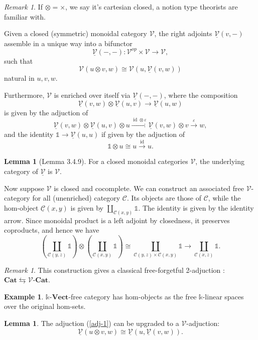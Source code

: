 \documentclass[11pt]{article}
\theoremstyle{definition}
\newtheorem{lemma}[theorem]{Lemma}
\newtheorem{example}[theorem]{Example}
\theoremstyle{remark}
\newtheorem{remark}[theorem]{Remark}
\newcommand{\id}{\operatorname{id}}
\newcommand{\calC}{\mathcal{C}}
\newcommand{\ucalC}{\underline{\mathcal{C}}}
\newcommand{\calV}{\mathcal{V}}
\newcommand{\ucalV}{\underline{\mathcal{V}}}
\newcommand{\bbone}{\mathbb{1}}
\begin{document}
\begin{remark}
    If $\otimes = \times$, we say it's cartesian closed, a notion type theorists are familiar with. 
\end{remark}

Given a closed (symmetric) monoidal category $\calV$, the right adjoints $\ucalV(v,-)$ assemble
in a unique way into a bifunctor
$$\ucalV(-,-) : \calV^{op} \times \calV \to \calV,$$
such that
\[\calV(u\otimes v, w) \cong \calV(u,\ucalV(v,w)) \tag{1} \label{adj-1}\]
natural in $u,v,w$.

Furthermore, $\calV$ is enriched over itself via $\ucalV(-,-)$, where the composition
$$\ucalV(v,w) \otimes \ucalV(u,v) \to \ucalV(u,w)$$
is given by the adjuction of
$$\ucalV(v,w) \otimes \ucalV(u,v) \otimes u \stackrel{\id\otimes \varepsilon}{\longrightarrow}
    \ucalV(v,w) \otimes v \stackrel{\varepsilon}{\to} w,$$
and the identity $\bbone \to \ucalV(u,u)$
if given by the adjuction of
$$\bbone \otimes u \cong u \stackrel{\id}{\to} u.$$

\begin{lemma}[Lemma 3.4.9]
    For a closed monoidal categories $\calV$, the underlying category of $\ucalV$ is $\calV$.
\end{lemma}

Now suppose $\calV$ is closed and cocomplete. We can construct an associated free $\calV$-category
for all (unenriched) category $\calC$. Its objects are those of $\calC$,
while the hom-object $\ucalC(x,y)$ is given by $\coprod_{{\calC}(x,y)}\bbone$.
The identity is given by the identity arrow.
Since monoidal product is a left adjoint by closedness, it preserves coproducts, and hence we have
$$(\coprod_{\calC(y,z)} \bbone) \otimes (\coprod_{\calC(x,y)} \bbone) \cong
    \coprod_{\calC(y,z) \times \calC(x,y)} \bbone \to \coprod_{\calC(x,z)} \bbone.$$

\begin{remark}
    This construction gives a classical free-forgetful 2-adjuction : $\mathbf{Cat} \leftrightarrows \calV\mbox{-}\mathbf{Cat}$.
\end{remark}

\begin{example}
    $\mathbb{k}\mbox{-}\mathbf{Vect}$-free category has hom-objects as the free $\mathbb{k}$-linear spaces over the original hom-sets. 
\end{example}

\begin{lemma}
    The adjuction (\ref{adj-1}) can be upgraded to a $\calV$-adjuction:
    \[
        \ucalV(u\otimes v, w) \cong \ucalV(u,\ucalV(v,w)).
    \]
\end{lemma}
\end{document}
